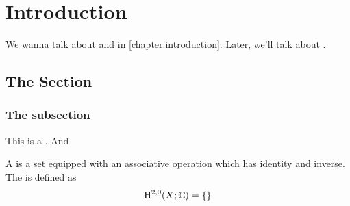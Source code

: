 \chapter{Introduction}\label{chapter:introduction}

%
%
We wanna talk about \cite{milnor1963groups} and \cite{milnor1956manifolds} in \autoref{chapter:introduction}. Later, we'll talk about \cite{milnor2000exotic}.

\section{The Section}

\lipsum[1]

\subsection{The subsection}

This is a . And

\lipsum[2]

\begin{definition}\label{def:first}
	A  is a set equipped with an associative operation which has identity and inverse. The  is defined as
	\[
		\operatorname{H}^{2,0}(X; \mathbb{C}) = \{\}
	\]
\end{definition}

